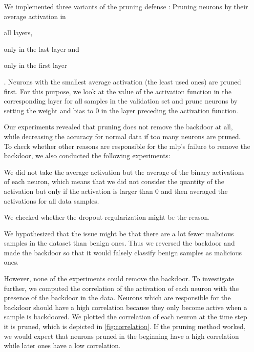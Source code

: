 \documentclass[9pt,sigconf,letterpaper,dvipsnames\ifx\removeHeaders\tempYes ,nonacm\fi]{acmart}
\begin{document}
We implemented three variants of the pruning defense \cite{gu_badnets:_2017}: Pruning neurons by their average activation in \begin{enumerate*}\item all layers, \item only in the last layer and \item only in the first layer \end{enumerate*}. Neurons with the smallest average activation (the least used ones) are pruned first. For this purpose, we look at the value of the activation function
in the corresponding layer for all samples in the validation set and prune neurons by setting the weight and bias to 0 in the layer preceding the activation function.

Our experiments revealed that pruning does not remove the backdoor at all, while decreasing the accuracy for normal data if too many neurons are pruned. To check whether other reasons are responsible for the \gls{mlp}'s failure to remove the backdoor, we also conducted the following experiments: \begin{enumerate*} \item We did not take the average activation but the average of the binary activations of each neuron, which means that we did not consider the quantity of the activation but only if the activation is larger than 0 and then averaged the activations for all data samples. \item We checked whether the dropout regularization might be the reason. \item We hypothesized that the issue might be that there are a lot fewer malicious samples in the dataset than benign ones. Thus we reversed the backdoor and made the backdoor so that it would falsely classify benign samples as malicious ones.
\end{enumerate*}

However, none of the experiments could remove the backdoor.
To investigate further, we computed the correlation of the activation of each neuron with the presence of the backdoor in the data. Neurons which are responsible for the backdoor should have a high correlation because they only become active when a sample is backdoored. We  plotted the correlation of each neuron at the time step it is pruned, which is depicted in \autoref{fig:correlation}. If the pruning method worked, we would expect
that neurons pruned in the beginning have a high correlation while later ones have a low correlation.
\end{document}
